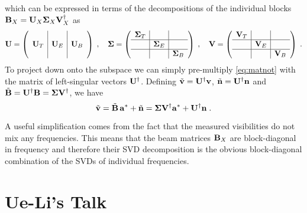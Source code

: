 \documentclass[onecolumn]{revtex4}
\begin{document}
which can be expressed in terms of the decompositions of the individual blocks
$\mathbf{B}_X = \mathbf{U}_X \mathbf{\Sigma}_X \mathbf{V}^{\dagger}_X$ as
\begin{equation}
\mathbf{U} =  \left(\begin{array}{c|c|c} & & \\ \mathbf{U}_T & \mathbf{U}_E & \mathbf{U}_B \\ &
    &\end{array}\right) \; , \quad
\mathbf{\Sigma} =  \left(\begin{array}{c|c|c} \mathbf{\Sigma}_T & & \\ \hline & \mathbf{\Sigma}_E & \\
    \hline & & \mathbf{\Sigma}_B \end{array}\right)
 \; , \quad
\mathbf{V} =  \left(\begin{array}{c|c|c} \mathbf{V}_T & & \\ \hline & \mathbf{V}_E & \\
    \hline & & \mathbf{V}_B\end{array}\right) \; .
\end{equation}
To project down onto the subspace we can simply pre-multiply \eqref{eq:matnot}
with the matrix of left-singular vectors $\mathbf{U}^\dagger$. Defining $\tilde{\mathbf{v}} =
\mathbf{U}^\dagger \mathbf{v}$, $\tilde{\mathbf{n}} = \mathbf{U}^\dagger \mathbf{n}$ and $\tilde{\mathbf{B}} = \mathbf{U}^\dagger \mathbf{B} = \mathbf{\Sigma}
\mathbf{V}^\dagger$, we have
\begin{equation}
\label{eq:matnot2}
\tilde{\mathbf{v}} = \tilde{\mathbf{B}}\, \mathbf{a}^* + \tilde{\mathbf{n}} = \mathbf{\Sigma} \mathbf{V}^\dagger \mathbf{a}^* + \mathbf{U}^\dagger \mathbf{n} \; .
\end{equation}

A useful simplification comes from the fact that the measured visibilities do
not mix any frequencies. This means that the beam matrices $\mathbf{B}_X$ are
block-diagonal in frequency and therefore their SVD decomposition is the obvious
block-diagonal combination of the SVDs of individual frequencies.


\section{Ue-Li's Talk}

\newcommand{\vlrarrow}{\ensuremath{\xrightarrow{\qquad\quad}}}
\end{document}
